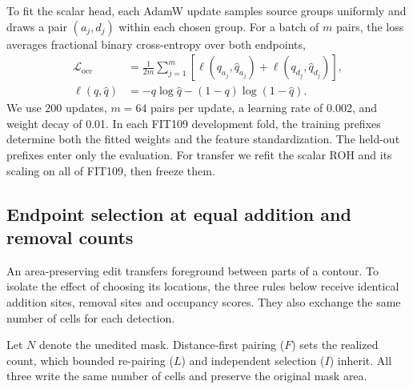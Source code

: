 \documentclass[journal]{IEEEtran}
\begin{document}
To fit the scalar head, each AdamW update samples source groups uniformly and draws a pair \((a_j,d_j)\) within each chosen group. For a batch of \(m\) pairs, the loss averages fractional binary cross-entropy over both endpoints,
\begin{equation}
\begin{split}
 \mathcal L_{\mathrm{occ}}
   &= \frac{1}{2m}\sum_{j=1}^{m}
       \left[\ell(q_{a_j},\widehat q_{a_j})+
             \ell(q_{d_j},\widehat q_{d_j})\right],\\
 \ell(q,\hat q)&=-q\log\hat q-(1-q)\log(1-\hat q).
\end{split}
\label{eq:occ-loss}
\end{equation}
We use 200 updates, \(m=64\) pairs per update, a learning rate of 0.002, and weight decay of 0.01. In each FIT109 development fold, the training prefixes determine both the fitted weights and the feature standardization. The held-out prefixes enter only the evaluation. For transfer we refit the scalar ROH and its scaling on all of FIT109, then freeze them.

\subsection{Endpoint selection at equal addition and removal counts}
\label{sec:selection}

An area-preserving edit transfers foreground between parts of a contour. To isolate the effect of choosing its locations, the three rules below receive identical addition sites, removal sites and occupancy scores. They also exchange the same number of cells for each detection.

Let \(N\) denote the unedited mask. Distance-first pairing (\(F\)) sets the realized count, which bounded re-pairing (\(L\)) and independent selection (\(I\)) inherit. All three write the same number of cells and preserve the original mask area.
\end{document}
